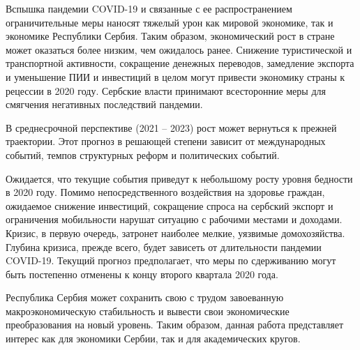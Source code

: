 Вспышка пандемии COVID-19 и связанные с ее распространением ограничительные меры наносят тяжелый урон как мировой экономике, так и экономике Республики Сербия.
Таким образом, экономический рост в стране может оказаться более низким, чем ожидалось ранее.
Снижение туристической и транспортной активности, сокращение денежных переводов, замедление экспорта и уменьшение ПИИ и инвестиций в целом могут привести экономику страны к рецессии в 2020 году.
Сербские власти принимают всесторонние меры для смягчения негативных последствий пандемии.

В среднесрочной перспективе (2021 -- 2023) рост может вернуться к прежней траектории.
Этот прогноз в решающей степени зависит от международных событий, темпов структурных реформ и политических событий.

Ожидается, что текущие события приведут к небольшому росту уровня бедности в 2020 году.
Помимо непосредственного воздействия на здоровье граждан, ожидаемое снижение инвестиций, сокращение спроса на сербский экспорт и ограничения мобильности нарушат ситуацию с рабочими местами и доходами.
Кризис, в первую очередь, затронет наиболее мелкие, уязвимые домохозяйства.
Глубина кризиса, прежде всего, будет зависеть от длительности пандемии COVID-19.
Текущий прогноз предполагает, что меры по сдерживанию могут быть постепенно отменены к концу второго квартала 2020 года.

Республика Сербия может сохранить свою с трудом завоеванную макроэкономическую стабильность и вывести свои экономические преобразования на новый уровень.
Таким образом, данная работа представляет интерес как для экономики Сербии, так и для академических кругов.

